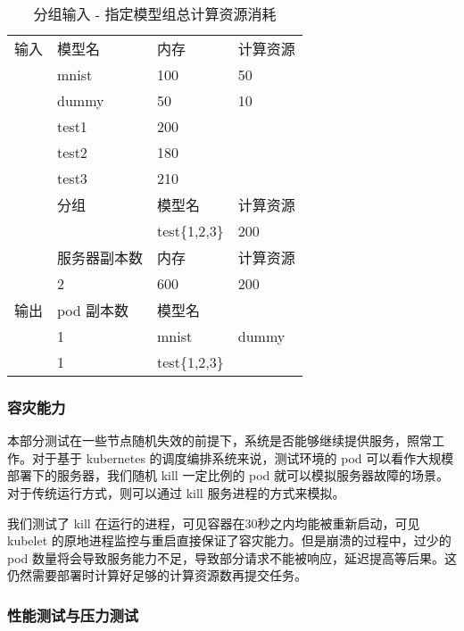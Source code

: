 \begin{table}[]
\begin{tabular}{llll}
输入 & 模型名     & 内存            & 计算资源  \\
   & mnist   & 100           & 50    \\
   & dummy   & 50            & 10    \\
   & test1   & 200           &       \\
   & test2   & 180           &       \\
   & test3   & 210           &       \\
   & 分组      & 模型名           & 计算资源  \\
   &         & test\{1,2,3\} & 200   \\
   & 服务器副本数  & 内存            & 计算资源  \\
   & 2       & 600           & 200   \\
输出 & pod 副本数 & 模型名           &       \\
   & 1       & mnist         & dummy \\
   & 1       & test\{1,2,3\} &
\end{tabular}
\caption{分组输入 - 指定模型组总计算资源消耗}
\end{table}



\subsubsection{容灾能力}

本部分测试在一些节点随机失效的前提下，系统是否能够继续提供服务，照常工作。对于基于 kubernetes 的调度编排系统来说，测试环境的 pod 可以看作大规模部署下的服务器，我们随机 kill 一定比例的 pod 就可以模拟服务器故障的场景。对于传统运行方式，则可以通过 kill 服务进程的方式来模拟。

我们测试了 kill 在运行的进程，可见容器在30秒之内均能被重新启动，可见 kubelet 的原地进程监控与重启直接保证了容灾能力。但是崩溃的过程中，过少的 pod 数量将会导致服务能力不足，导致部分请求不能被响应，延迟提高等后果。这仍然需要部署时计算好足够的计算资源数再提交任务。

\subsubsection{性能测试与压力测试}

